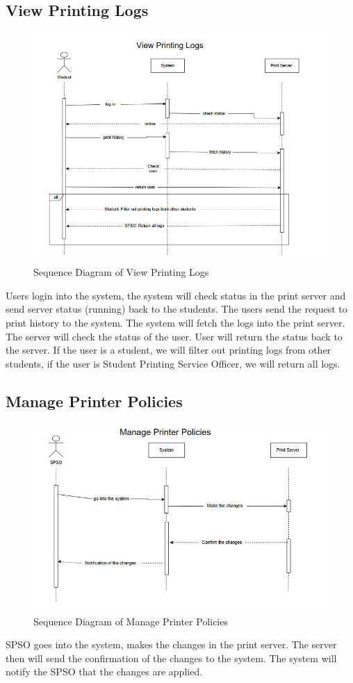 \subsection{View Printing Logs}
\begin{figure}[H]
\centering
  \includegraphics[max width=0.9\linewidth,origin = c]{chapters/4. system-modeling/picture/ViewPrintingLogs.png}
  \caption{Sequence Diagram of View Printing Logs}%
\end{figure}
Users login into the system, the system will check status in the print server and send server status (running) back to the students. The users send the request to print history to the system. The system will fetch the logs into the print server. The server will check the status of the user. User will return the status back to the server. If the user is a student, we will filter out printing logs from other students, if the user is Student Printing Service Officer, we will return all logs.

\subsection{Manage Printer Policies}
\begin{figure}[H]
\centering
  \includegraphics[max width=0.9\linewidth,origin = c]{chapters/4. system-modeling/picture/ManagePrinterPolicies.png}
  \caption{Sequence Diagram of Manage Printer Policies}%
\end{figure}
SPSO goes into the system, makes the changes in the print server. The server then will send the confirmation of the changes to the system. The system will notify the SPSO that the changes are applied.
